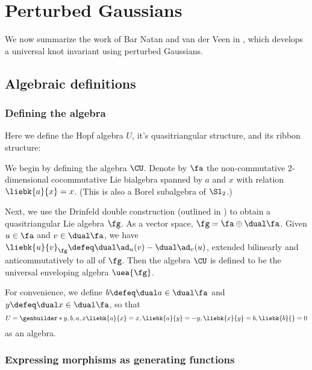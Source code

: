 \chapter{Perturbed Gaussians}\label{ch:perturbed_gaussians}
We now summarize the work of Bar Natan and van der Veen in \cite{BV}, which
develops a universal knot invariant using perturbed Gaussians. 

\section{Algebraic definitions}
\subsection{Defining the algebra}
Here we define the Hopf algebra $U$, it's quasitriangular structure, and its
ribbon structure:

We begin by defining the algebra $\CU$. Denote by $\fa$ the non-commutative
$2$-dimensional cocommutative Lie bialgebra spanned by $a$ and $x$ with relation
$\liebk{a}{x} = x$. (This is also a Borel subalgebra of $\Sl_2$.)

Next, we use the Drinfeld double construction (outlined in \cite{ES}) to obtain
a quasitriangular Lie algebra $\fg$. As a vector space,
$\fg = \fa \oplus \dual\fa$. Given $u \in \fa$ and $v\in \dual \fa$, we have
$\liebk{u}{v}_{\fg} \defeq \dual\ad_u(v) - \dual\ad_v(u)$, extended bilinearly
and anticommutatively to all of $\fg$.
Then the algebra $\CU$ is defined to be the universal enveloping algebra
$\uea{\fg}$.

\begin{remark}
        For convenience, we define $b \defeq \dual a \in \dual\fa$ and
        $y \defeq \dual x \in \dual\fa$, so that
        \begin{equation}
                U = \genbuilder*{y, b, a, x}{
                        \liebk{a}{x} = x,
                        \liebk{a}{y} = -y,
                        \liebk{x}{y} = b,
                        \liebk{b}{ } = 0
                }
        \end{equation}
        as an algebra.
\end{remark}


\subsection{Expressing morphisms as generating functions}

